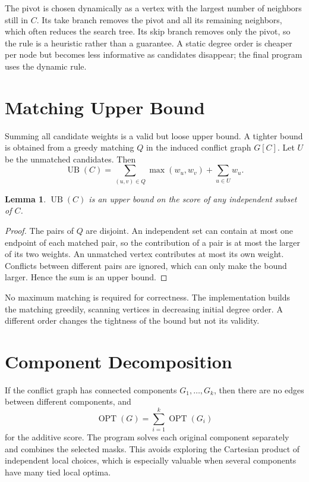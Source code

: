 \documentclass[12pt,a4paper]{report}
\newtheorem{lemma}{Lemma}
\begin{document}
The pivot is chosen dynamically as a vertex with the largest number of
neighbors still in $C$.  Its take branch removes the pivot and all its remaining
neighbors, which often reduces the search tree.  Its skip branch removes only
the pivot, so the rule is a heuristic rather than a guarantee.  A static
degree order is cheaper per node but becomes less informative as candidates
disappear; the final program uses the dynamic rule.

\section{Matching Upper Bound}

Summing all candidate weights is a valid but loose upper bound.  A tighter
bound is obtained from a greedy matching $Q$ in the induced conflict graph
$G[C]$.  Let $U$ be the unmatched candidates.  Then
\[
\operatorname{UB}(C)=\sum_{(u,v)\in Q}\max(w_u,w_v)+\sum_{u\in U}w_u .
\]

\begin{lemma}
$\operatorname{UB}(C)$ is an upper bound on the score of any independent subset
of $C$.
\end{lemma}

\begin{proof}
The pairs of $Q$ are disjoint.  An independent set can contain at most one
endpoint of each matched pair, so the contribution of a pair is at most the
larger of its two weights.  An unmatched vertex contributes at most its own
weight.  Conflicts between different pairs are ignored, which can only make the
bound larger.  Hence the sum is an upper bound.
\end{proof}

No maximum matching is required for correctness.  The implementation builds the
matching greedily, scanning vertices in decreasing initial degree order.  A
different order changes the tightness of the bound but not its validity.

\section{Component Decomposition}

If the conflict graph has connected components $G_1,\ldots,G_k$, then there are
no edges between different components, and
\[
\operatorname{OPT}(G)=\sum_{i=1}^{k}\operatorname{OPT}(G_i)
\]
for the additive score.  The program solves each original component separately
and combines the selected masks.  This avoids exploring the Cartesian product
of independent local choices, which is especially valuable when several
components have many tied local optima.
\end{document}
